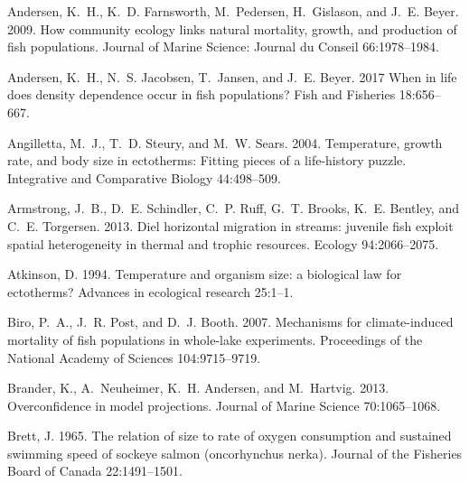 \documentclass[11pt]{article}\usepackage[]{graphicx}\usepackage[]{color,soul}
\begin{document}

\begin{thebibliography}{62}
\linespread{1.5}
\providecommand{\natexlab}[1]{#1}

Andersen, K.~H., K.~D. Farnsworth, M.~Pedersen, H.~Gislason, and J.~E. Beyer.
  2009.
\newblock How community ecology links natural mortality, growth, and production
  of fish populations.
 Journal of Marine Science: Journal du Conseil 66:1978--1984.

Andersen, K.~H., N.~S. Jacobsen, T.~Jansen, and J.~E. Beyer. 2017
\newblock When in life does density dependence occur in fish populations?
\newblock Fish and Fisheries 18:656--667.

Angilletta, M.~J., T.~D. Steury, and M.~W. Sears. 2004.
\newblock Temperature, growth rate, and body size in ectotherms: Fitting pieces
  of a life-history puzzle.
\newblock Integrative and Comparative Biology 44:498--509.

Armstrong, J.~B., D.~E. Schindler, C.~P. Ruff, G.~T. Brooks, K.~E. Bentley, and
  C.~E. Torgersen. 2013.
\newblock Diel horizontal migration in streams: juvenile fish exploit spatial
  heterogeneity in thermal and trophic resources.
\newblock Ecology 94:2066--2075.

Atkinson, D. 1994.
\newblock Temperature and organism size: a biological law for ectotherms?
\newblock Advances in ecological research 25:1--1.

Biro, P.~A., J.~R. Post, and D.~J. Booth. 2007.
\newblock Mechanisms for climate-induced mortality of fish populations in
  whole-lake experiments.
\newblock Proceedings of the National Academy of Sciences 104:9715--9719.

Brander, K., A.~Neuheimer, K.~H. Andersen, and M.~Hartvig. 2013.
\newblock Overconfidence in model projections.
 Journal of Marine Science 70:1065--1068.

Brett, J. 1965.
\newblock The relation of size to rate of oxygen consumption and sustained
  swimming speed of sockeye salmon (oncorhynchus nerka).
\newblock Journal of the Fisheries Board of Canada 22:1491--1501.


\end{thebibliography}
\end{document}
